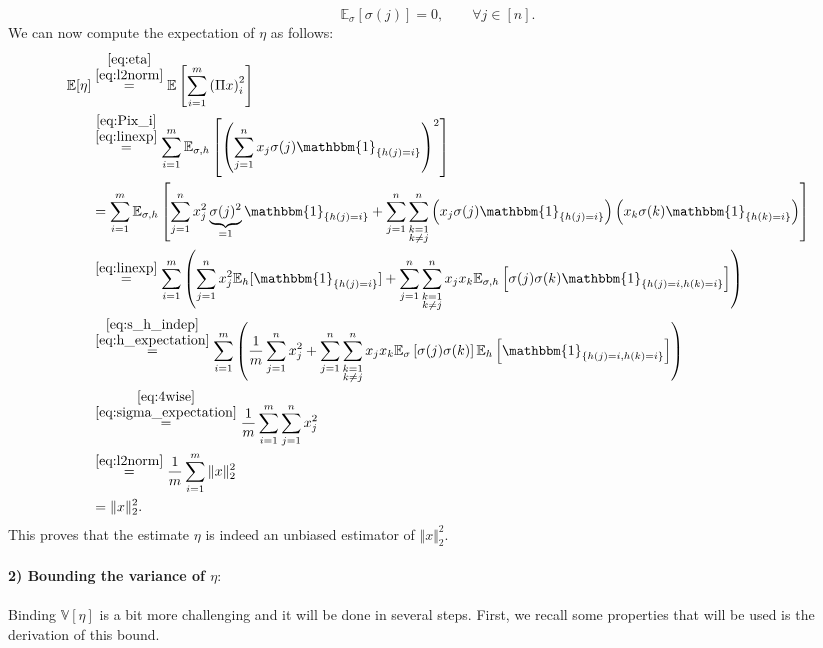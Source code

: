 \documentclass[10pt,usenames,dvipsnames]{article}
\newcommand{\Ebb}{\mathbb{E}}
\newcommand{\Vbb}{\mathbb{V}}
\newcommand{\ind}{\mathbbm{1}} %
\newenvironment{exercise}[2][Exercise]{\begin{trivlist}
  \item[\hskip \labelsep {\bfseries #1}\hskip \labelsep {\bfseries #2.}]}{\end{trivlist}}
\begin{document}
\begin{exercise}{2b}
		\begin{equation}
		\label{eq:sigma_expectation}
		 \Ebb_{\sigma}[\sigma(j)] = 0, \qquad \forall j \in [n].
		\end{equation}		
		We can now compute the expectation of $\eta$ as follows:
		\begin{align}
			\Ebb[\eta] & \overset{\substack{\eqref{eq:eta} \\ \eqref{eq:l2norm}}}{=}\Ebb \left[ \sum_{i=1}^m \left( \Pi x \right)_i^2 \right] 
					\nonumber \\
					& \overset{\substack{\eqref{eq:Pix_i} \\ \eqref{eq:linexp}}}{=} \sum_{i=1}^m  \Ebb_{\sigma,h} \left[\left(\sum_{j=1}^n  x_j \sigma(j) \ind_{\{ h(j) = i\}} \right)^2\right] 
					\nonumber \\
					& =  	\sum_{i=1}^m\Ebb_{\sigma,h} \left[\sum_{j=1}^n x_j^2 \underbrace{\sigma(j)^2}_{=1} \ind_{\{ h(j) = i\}} + \sum_{j=1}^{n}\sum_{\substack{k=1 \\ k \neq j}}^n \left( x_j \sigma(j) \ind_{\{ h(j) = i\}} \right)\left(  x_k \sigma(k) \ind_{\{ h(k) = i\}} \right)\right] 
					\nonumber \\
					& \overset{\eqref{eq:linexp}}{=} \sum_{i=1}^m \left(	\sum_{j=1}^n x_j^2 \Ebb_h[\ind_{\{ h(j) = i\}}] + \sum_{j=1}^{n}\sum_{\substack{k=1 \\ k \neq j}}^n x_j x_k  \Ebb_{\sigma,h}\left[\sigma(j)\sigma(k) \ind_{\{ h(j) = i,  h(k) = i\}} \right] \right) 
					\nonumber \\
					& \overset{\substack{\eqref{eq:s_h_indep} \\ \eqref{eq:h_expectation}}}{=}  \sum_{i=1}^m \left(\frac{1}{m}	\sum_{j=1}^n x_j^2 + \sum_{j=1}^{n}\sum_{\substack{k=1 \\ k \neq j}}^n x_j x_k  \Ebb_\sigma\left[\sigma(j)\sigma(k)\right] \Ebb_h\left[\ind_{\{ h(j) = i,  h(k) = i\}} \right] \right)
					\nonumber \\	
					& \overset{\substack{\eqref{eq:4wise}\\\eqref{eq:sigma_expectation}}}{=} \frac{1}{m} \sum_{i=1}^m	\sum_{j=1}^n x_j^2 
					\nonumber \\	
					& \overset{\eqref{eq:l2norm}}{=}  \frac{1}{m} \sum_{i=1}^m \Vert x \Vert_2^2 
					\nonumber \\
					& = \Vert x \Vert_2^2. \label{eq:eta_exp}															
		\end{align}
		This proves that the estimate $\eta$ is indeed an unbiased estimator of $\Vert x \Vert_2^2$. 
		\\ \\
	        \textbf{2) Bounding the variance of $\eta$}: 
	        \\ \\
		Binding $\Vbb[\eta]$ is a bit more challenging and it will be done in several steps. 	First, we recall some properties that will be used is the derivation of this bound.
		

\end{exercise}
\end{document}

